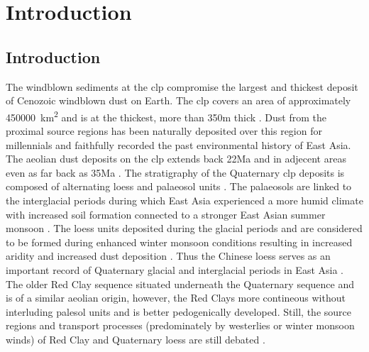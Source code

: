 \thispagestyle{plain}
\chapter{Introduction}
\section{Introduction}
The windblown sediments at the \acrfull{clp} compromise the largest and thickest deposit of Cenozoic windblown dust on Earth.  The \acrshort{clp} covers an area of approximately \SI{450000}{\kilo\metre\squared} and is at the thickest, more than 350\si{\metre} thick \parencite{liu1985loess}.
Dust from the proximal source regions has been naturally deposited over this region for millennials and faithfully recorded the past environmental history of East Asia. 
The aeolian dust deposits on the \acrshort{clp} extends back 22Ma \parencite{qiang2011new} and in adjecent areas even as far back as 35Ma \parencite{licht2014asian,wasiljeff2020magnetostratigraphic}. 
The stratigraphy of the Quaternary \acrshort{clp} deposits is composed of alternating loess and palaeosol units \parencite{derbyshire1995variations}. 
The palaeosols are linked to the interglacial periods during which East Asia experienced a more humid climate with increased soil formation connected to a stronger East Asian summer monsoon \parencite{maher1992paleoclimatic}. 
The loess units deposited during the glacial periods and are considered to be formed during enhanced winter monsoon conditions resulting in increased aridity and increased dust deposition \parencite{xiao1995grain}.
Thus the Chinese loess serves as an important record of Quaternary glacial and interglacial periods in East Asia \parencite{kohfeld2003glacial,an2014cenozoicChange}.
The older Red Clay sequence situated underneath the Quaternary sequence and is of a similar aeolian origin, however, the Red Clays more contineous without interluding palesol units and is better pedogenically developed. Still, the source regions and transport processes (predominately by westerlies or winter monsoon winds) of Red Clay and Quaternary loess are still debated \parencite{shang2016variations,bird2015quaternary,miao2004spatial}.

